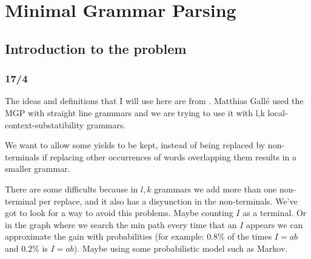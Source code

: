 \section{Minimal Grammar Parsing}
\subsection{Introduction to the problem}
\subsubsection{17/4}

The ideas and definitions that I will use here are from \cite[p. 70]{GThesis}.
Matthias Gallé used the MGP with straight line grammars and we are trying to use it with l,k local-context-substatibility grammars.

We want to allow some yields to be kept, instead of being replaced by non-terminals if replacing other occurrences of words overlapping them results in a smaller grammar.







There are some difficults because in $l,k$ grammars we add more than one non-terminal per replace, and it also has a disyunction in the non-terminals. We've got to look for a way to avoid this problems. Maybe counting $I$ as a terminal. Or in the graph where we search the min path every time that an $I$ appears we can approximate the gain with probabilities (for example: $0.8\%$ of the times $I = ab$ and $0.2\%$ is $I = ab$). 
Maybe using some probabilistic model such as Markov.